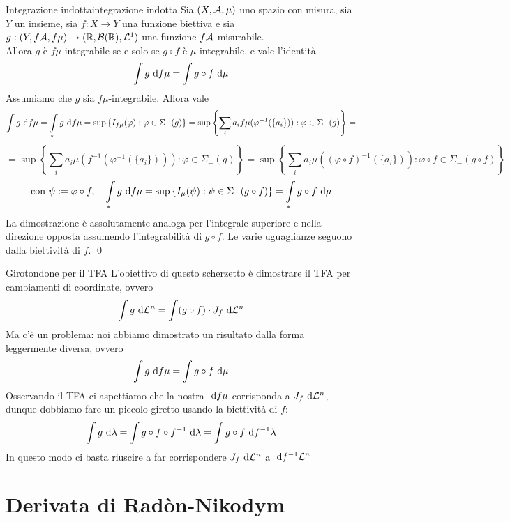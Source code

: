 \documentclass{article}
\begin{document}
\begin{theorem}{Integrazione indotta}{integrazione indotta}
    Sia $(X,\mathcal{A},\mu)$ uno spazio con misura, sia $Y$ un insieme, sia $f:X\to Y$ una funzione biettiva e sia $g:(Y,f\mathcal{A},f\mu)\to (\mathbb{R},\mathcal{B}(\mathbb{R}),\mathcal{L}^1)$ una funzione $f\mathcal{A}$-misurabile.\\
    Allora $g$ è $f\mu$-integrabile se e solo se $g\circ f$ è $\mu$-integrabile, e vale l'identità
    \[\intop g \de f\mu = \intop g\circ f \de \mu\]
    \proof
    Assumiamo che $g$ sia $f\mu$-integrabile. Allora vale
    \[\intop g \de f\mu = \intop_* g \de f\mu = \sup\left\{I_{f\mu}(\varphi) : \varphi \in \Sigma_-(g)\right\}=\sup\left\{ \sum_i a_i f\mu(\varphi^{-1}(\{a_i\})) : \varphi \in \Sigma_-(g) \right\} =\]
    \[ = \sup\left\{ \sum_i a_i \mu(f^{-1}(\varphi^{-1}(\{a_i\}))) : \varphi \in \Sigma_-(g) \right\} = \sup\left\{ \sum_i a_i \mu((\varphi \circ f)^{-1}(\{a_i\})) : \varphi \circ f \in \Sigma_-(g\circ f) \right\}\]
    \[\text{con } \psi := \varphi \circ f, \quad \intop_* g \de f\mu =\sup\left\{ I_\mu(\psi) : \psi \in \Sigma_-(g\circ f) \right\} = \intop_* g \circ f \de \mu\]
    La dimostrazione è assolutamente analoga per l'integrale superiore e nella direzione opposta assumendo l'integrabilità di $g\circ f$. Le varie uguaglianze seguono dalla biettività di $f$.
    \qed
\end{theorem}

\begin{remark}{Girotondone per il TFA}{}
    L'obiettivo di questo scherzetto è dimostrare il TFA per cambiamenti di coordinate, ovvero
    \[\intop g \de \L^n = \intop (g \circ f)\cdot J_f \de \L^n  \]
    Ma c'è un problema: noi abbiamo dimostrato un risultato dalla forma leggermente diversa, ovvero 
    \[\intop g \de f\mu = \intop g\circ f \de \mu \]
    Osservando il TFA ci aspettiamo che la nostra $\text{ d} f\mu$ corrisponda a $J_f \text{ d} \mathcal{L}^n$, dunque dobbiamo fare un piccolo giretto usando la biettività di $f$:
    \[\intop g \de \lambda = \intop g \circ f \circ f^{-1} \de \lambda = \intop g \circ f \de f^{-1}\lambda\]
    In questo modo ci basta riuscire a far corrispondere $J_f \text{ d} \mathcal{L}^n$ a $\text{ d} f^{-1} \mathcal{L}^n$
\end{remark}

\pagebreak
\section{Derivata di Radòn-Nikodym}
\end{document}
